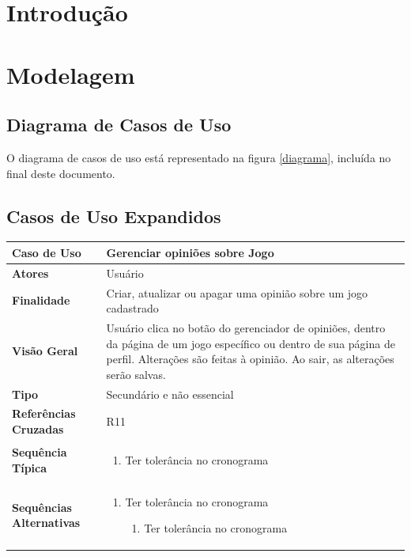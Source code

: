 \documentclass[a4paper,11pt]{article}
\begin{document}
\tableofcontents
\listoffigures
\newpage

\section{Introdução}
	
\section{Modelagem}

\subsection{Diagrama de Casos de Uso}

O diagrama de casos de uso está representado na figura \ref{diagrama}, incluída no final deste documento.

\subsection{Casos de Uso Expandidos}

\begin{table}[H]
		\begin{tabularx}{\textwidth}{|l|X|}
		\hline
			\textbf{Caso de Uso} &  Gerenciar opiniões sobre Jogo \\ \hline
			\textbf{Atores} &  Usuário  \\ \hline
			\textbf{Finalidade} &  Criar, atualizar ou apagar uma opinião sobre um jogo cadastrado  \\ \hline
			\textbf{Visão Geral} & Usuário clica no botão do gerenciador de opiniões, dentro
da página de um jogo específico ou dentro de sua página de perfil. Alterações são
feitas à opinião. Ao sair, as alterações serão salvas.  \\ \hline
			\textbf{Tipo} &  Secundário e não essencial\\ \hline
			\textbf{Referências Cruzadas} &  R11 \\ \hline
			\textbf{Sequência Típica} & 
			\begin{enumerate}
			\item Ter tolerância no cronograma
			\end{enumerate} \\ \hline
			\textbf{Sequências Alternativas} & 
			\begin{enumerate}
			\item Ter tolerância no cronograma
			\begin{enumerate}
			\item Ter tolerância no cronograma
			\end{enumerate}
			\end{enumerate} \\ \hline
		\end{tabularx}
\end{table}
\end{document}
